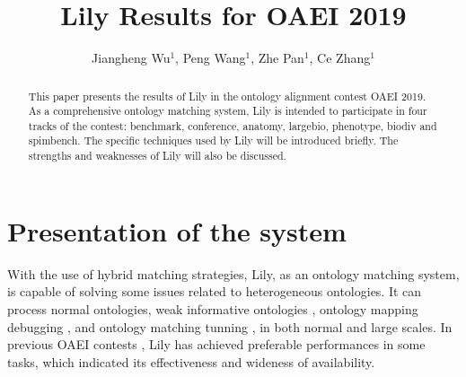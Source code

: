 \documentclass{llncs}
\begin{document}
\mainmatter              %
\title{Lily Results for OAEI 2019}
\author{Jiangheng Wu$^{1}$, Peng Wang$^{1}$, Zhe Pan$^{1}$, Ce Zhang$^{1}$}


\maketitle

\begin{abstract}
This paper presents the results of Lily in the ontology alignment contest OAEI 2019. As a comprehensive ontology matching system, Lily is intended to participate in four tracks of the contest: benchmark, conference, anatomy, largebio, phenotype, biodiv and spimbench. The specific techniques used by Lily will be introduced briefly. The strengths and weaknesses of Lily will also be discussed.
\end{abstract}

\section{Presentation of the system}
With the use of hybrid matching strategies, Lily, as an ontology matching system, is capable of solving some issues related to heterogeneous ontologies. It can process normal ontologies, weak informative ontologies \cite{simprop}, ontology mapping debugging \cite{om_dbg}, and ontology matching tunning \cite{param_tuning}, in both normal and large scales. In previous OAEI contests \cite{lily_oaei2009,lily_oaei2008,lily_oaei2007}, Lily has achieved preferable performances in some tasks, which indicated its effectiveness and wideness of availability. \par
\end{document}
